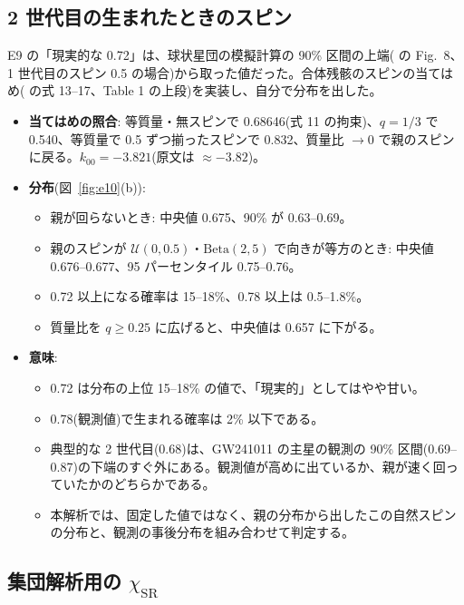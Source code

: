 \subsection{2 世代目の生まれたときのスピン}

E9 の「現実的な 0.72」は、球状星団の模擬計算の 90\% 区間の上端( の Fig.~8、1 世代目のスピン 0.5 の場合)から取った値だった。合体残骸のスピンの当てはめ( の式 13--17、Table 1 の上段)を実装し、自分で分布を出した。
\begin{itemize}
\item \textbf{当てはめの照合}: 等質量・無スピンで 0.68646(式 11 の拘束)、$q=1/3$ で 0.540、等質量で 0.5 ずつ揃ったスピンで 0.832、質量比 $\to0$ で親のスピンに戻る。$k_{00}=-3.821$(原文は $\approx-3.82$)。
\item \textbf{分布}(図~\ref{fig:e10}(b)):
  \begin{itemize}
  \item 親が回らないとき: 中央値 0.675、90\% が 0.63--0.69。
  \item 親のスピンが $\mathcal U(0,0.5)$・$\mathrm{Beta}(2,5)$ で向きが等方のとき: 中央値 0.676--0.677、95 パーセンタイル 0.75--0.76。
  \item 0.72 以上になる確率は 15--18\%、0.78 以上は 0.5--1.8\%。
  \item 質量比を $q\ge0.25$ に広げると、中央値は 0.657 に下がる。
  \end{itemize}
\item \textbf{意味}:
  \begin{itemize}
  \item 0.72 は分布の上位 15--18\% の値で、「現実的」としてはやや甘い。
  \item 0.78(観測値)で生まれる確率は 2\% 以下である。
  \item 典型的な 2 世代目(0.68)は、GW241011 の主星の観測の 90\% 区間(0.69--0.87)の下端のすぐ外にある。観測値が高めに出ているか、親が速く回っていたかのどちらかである。
  \item 本解析では、固定した値ではなく、親の分布から出したこの自然スピンの分布と、観測の事後分布を組み合わせて判定する。
  \end{itemize}
\end{itemize}

\subsection{集団解析用の $\chi_\mathrm{SR}$}

